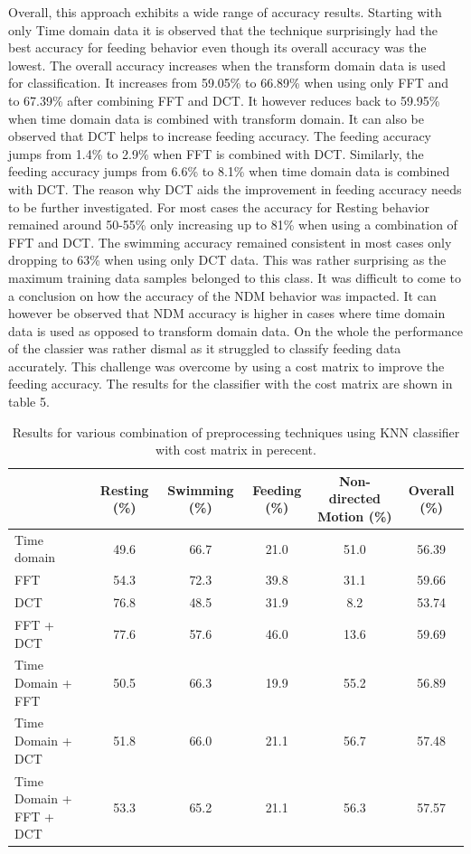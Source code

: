 \documentclass[conference]{IEEEtran}
\begin{document}
Overall, this approach exhibits a wide range of accuracy results. Starting with only Time domain data it is observed that the technique surprisingly had the best accuracy for feeding behavior even though its overall accuracy was the lowest. The overall accuracy increases when the transform domain data is used for classification. It increases from 59.05\% to 66.89\% when using only FFT and to 67.39\% after combining FFT and DCT. It however reduces back to 59.95\% when time domain data is combined with transform domain. It can also be observed that DCT helps to increase feeding accuracy. The feeding accuracy jumps from 1.4\% to 2.9\% when FFT is combined with DCT. Similarly, the feeding accuracy jumps from 6.6\% to 8.1\% when time domain data is combined with DCT. The reason why DCT aids the improvement in feeding accuracy needs to be further investigated. For most cases the accuracy for Resting behavior remained around 50-55\% only increasing up to 81\% when using a combination of FFT and DCT. The swimming accuracy remained consistent in most cases only dropping to 63\% when using only DCT data. This was rather surprising as the maximum training data samples belonged to this class. It was difficult to come to a conclusion on how the accuracy of the NDM behavior was impacted. It can however be observed that NDM accuracy is higher in cases where time domain data is used as opposed to transform domain data. On the whole the performance of the classier was rather dismal as it struggled to classify feeding data accurately. This challenge was overcome by using a cost matrix to improve the feeding accuracy. The results for the classifier with the cost matrix are shown in table 5.

\begin{table}[h]
	\centering
	\caption{Results for various combination of preprocessing techniques using KNN classifier with cost matrix in perecent.}
	\begin{tabular}{l c c c c c}
	\hline
	& \textbf{Resting} (\%) & \textbf{Swimming}  (\%) & \textbf{Feeding}  (\%) & \textbf{Non-directed Motion}  (\%) & \textbf{Overall}  (\%) \\
	\hline
	Time domain & 49.6	&66.7&	21.0&	51.0&	56.39\\
     FFT & 54.3&	72.3&	39.8&	31.1&	59.66\\
     DCT & 76.8&	48.5&	31.9&	8.2&	53.74\\
   FFT + DCT & 77.6&	57.6&	46.0&	13.6&	59.69\\
	Time Domain + FFT & 50.5&	66.3&	19.9&	55.2&	56.89\\
	Time Domain + DCT & 51.8&	66.0&	21.1&	56.7&	57.48\\
	Time Domain + FFT + DCT & 53.3&	65.2&	21.1&	56.3&	57.57\\
	\hline
	\end{tabular}
	\label{without cost matrix}
\end{table}
\end{document}
